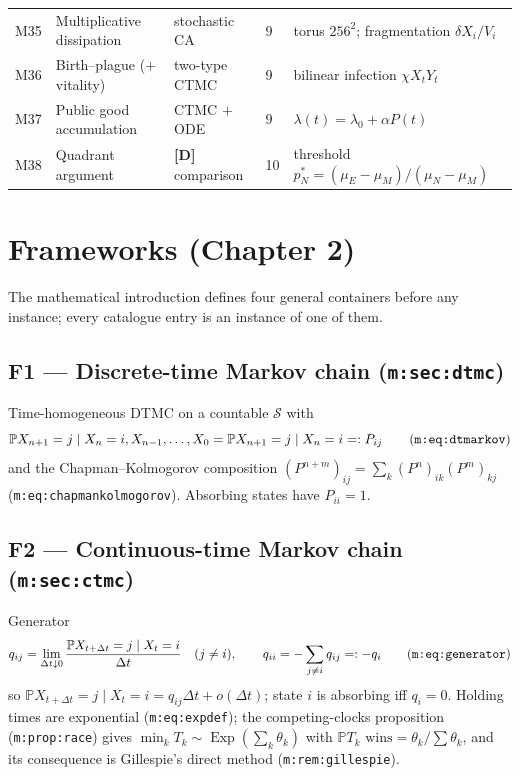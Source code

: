 \documentclass[11pt,a4paper]{article}
\newcommand{\PR}{\mathbb{P}}
\newcommand{\Exp}{\operatorname{Exp}}
\begin{document}
{\begin{longtable}{@{}p{0.9cm}p{4.3cm}p{2.6cm}p{2.2cm}p{4.6cm}@{}}
M35 & Multiplicative dissipation & stochastic CA & 9 & torus $256^2$; fragmentation $\delta X_i/V_i$ \\
M36 & Birth--plague ($+$ vitality) & two-type CTMC & 9 & bilinear infection $\chi X_tY_t$ \\
M37 & Public good accumulation & CTMC $+$ ODE & 9 & $\lambda(t)=\lambda_0+\alpha P(t)$ \\
\midrule
M38 & Quadrant argument & \textbf{[D]} comparison & 10 & threshold $p_N^*=(\mu_E-\mu_M)/(\mu_N-\mu_M)$ \\
\bottomrule
\end{longtable}
}

\section{Frameworks (Chapter 2)}

The mathematical introduction defines four general containers before any
instance; every catalogue entry is an instance of one of them.

\subsection*{F1 --- Discrete-time Markov chain (\texttt{m:sec:dtmc})}
Time-homogeneous DTMC on a countable $\mathcal S$ with
\[
\PR{X_{n+1}=j\mid X_n=i,X_{n-1},\ldots,X_0}
=\PR{X_{n+1}=j\mid X_n=i}=:P_{ij}
\qquad\text{(\texttt{m:eq:dtmarkov})}
\]
and the Chapman--Kolmogorov composition
$(P^{n+m})_{ij}=\sum_k (P^n)_{ik}(P^m)_{kj}$
(\texttt{m:eq:chapmankolmogorov}). Absorbing states have $P_{ii}=1$.

\subsection*{F2 --- Continuous-time Markov chain (\texttt{m:sec:ctmc})}
Generator
\[
q_{ij}=\lim_{\Delta t\downarrow0}\frac{\PR{X_{t+\Delta t}=j\mid X_t=i}}{\Delta t}\quad(j\ne i),
\qquad q_{ii}=-\sum_{j\ne i}q_{ij}=:-q_i
\qquad\text{(\texttt{m:eq:generator})}
\]
so $\PR{X_{t+\Delta t}=j\mid X_t=i}=q_{ij}\Delta t+o(\Delta t)$; state $i$
is absorbing iff $q_i=0$. Holding times are exponential
(\texttt{m:eq:expdef}); the competing-clocks proposition
(\texttt{m:prop:race}) gives $\min_k T_k\sim\Exp(\sum_k\theta_k)$ with
$\PR{T_k\text{ wins}}=\theta_k/\sum\theta_k$, and its consequence is
Gillespie's direct method (\texttt{m:rem:gillespie}).
\end{document}
